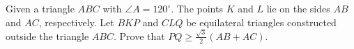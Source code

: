 Given a triangle $ ABC$ with $ \angle A = 120^{\circ}$. The points $ K$ and $ L$ lie on the sides $ AB$ and $ AC$,  respectively. Let $ BKP$ and $ CLQ$ be equilateral triangles constructed outside the triangle $ ABC$. Prove that $ PQ \ge\frac{\sqrt 3}{2}\left(AB + AC\right)$.